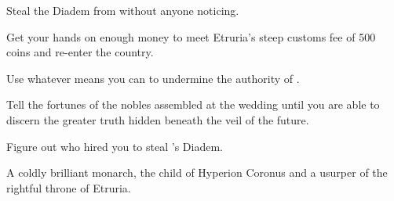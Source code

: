 \documentclass[char]{Kos}
\begin{document}
\begin{itemz}[Goals]
\item Steal the Diadem from \cMerchant{} without anyone noticing.
\item Get your hands on enough money to meet Etruria's steep customs fee of 500 coins and re-enter the country.
\item Use whatever means you can to undermine the authority of \cEtruriaKing{\Monarch} \cEtruriaKing{}.
\item Tell the fortunes of the nobles assembled at the wedding until you are able to discern the greater truth hidden beneath the veil of the future.
\item Figure out who hired you to steal \cMerchant{}'s Diadem.
\end{itemz}

\begin{contacts}
\contact{\cEtruriaKing{}} A coldly brilliant monarch, the child of Hyperion Coronus and a usurper of the rightful throne of Etruria.
\end{contacts}
\end{document}
